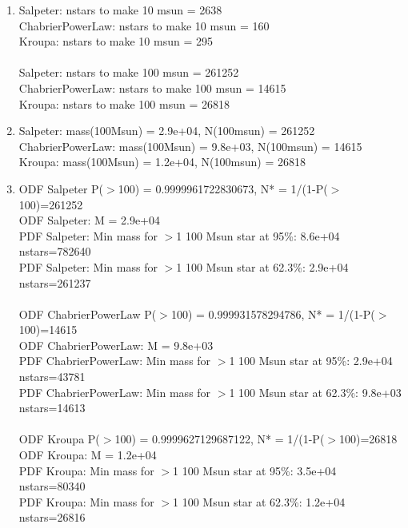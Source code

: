 \documentclass{article}
\begin{document}
\begin{enumerate}
\begin{enumerate}
\item %
Salpeter: nstars to make 10 msun = 2638\\
ChabrierPowerLaw: nstars to make 10 msun = 160\\
Kroupa: nstars to make 10 msun = 295\\
\\
Salpeter: nstars to make 100 msun = 261252\\
ChabrierPowerLaw: nstars to make 100 msun = 14615\\
Kroupa: nstars to make 100 msun = 26818

\item %

Salpeter: mass(100Msun) = 2.9e+04, N(100msun) = 261252 \\ 
ChabrierPowerLaw: mass(100Msun) = 9.8e+03, N(100msun) = 14615 \\ 
Kroupa: mass(100Msun) = 1.2e+04, N(100msun) = 26818


\item %

ODF Salpeter P($>$100) = 0.9999961722830673, N* = 1/(1-P($>$100)=261252\\
ODF Salpeter: M = 2.9e+04\\
PDF Salpeter: Min mass for $>$1 100 Msun star at 95\%: 8.6e+04 nstars=782640\\
PDF Salpeter: Min mass for $>$1 100 Msun star at 62.3\%: 2.9e+04 nstars=261237\\
\\
ODF ChabrierPowerLaw P($>$100) = 0.999931578294786, N* = 1/(1-P($>$100)=14615\\
ODF ChabrierPowerLaw: M = 9.8e+03\\
PDF ChabrierPowerLaw: Min mass for $>$1 100 Msun star at 95\%: 2.9e+04 nstars=43781\\
PDF ChabrierPowerLaw: Min mass for $>$1 100 Msun star at 62.3\%: 9.8e+03 nstars=14613\\
\\
ODF Kroupa P($>$100) = 0.9999627129687122, N* = 1/(1-P($>$100)=26818\\
ODF Kroupa: M = 1.2e+04\\
PDF Kroupa: Min mass for $>$1 100 Msun star at 95\%: 3.5e+04 nstars=80340\\
PDF Kroupa: Min mass for $>$1 100 Msun star at 62.3\%: 1.2e+04 nstars=26816\\




\end{enumerate}
\end{enumerate}
\end{document}
